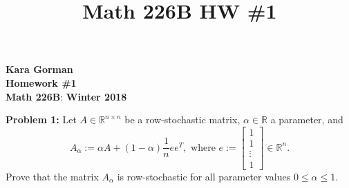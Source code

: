 \documentclass[12pt]{article}
\title{Math 226B HW \#1}
\def\R{\mathbb{R}}
\begin{document}
\begin{flushleft}
\textbf{Kara Gorman}\\
\textbf{Homework \#1}\\
\textbf{Math 226B}: \textbf{Winter 2018}
\end{flushleft}

\bigskip\bigskip
\noindent
\textbf{Problem 1:} Let $A \in \R^{n\times n}$ be a row-stochastic matrix, $\alpha \in \R$ a parameter, and
$$A_{\alpha} := \alpha A + (1 - \alpha)\frac{1}{n}ee^T, \text{ where } e:= \begin{bmatrix}
			1 \\
			1 \\
			\vdots \\
			1 \end{bmatrix} \in \R^n.$$
Prove that the matrix $A_{\alpha}$ is row-stochastic for all parameter values $0 \leq \alpha \leq 1$.\\
\end{document}
